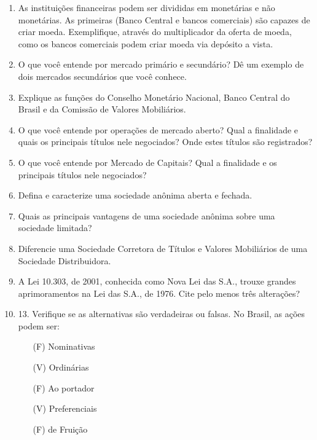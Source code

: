 \documentclass{article}
\begin{document}
\begin{enumerate}
    \item As instituições financeiras podem ser divididas em monetárias e não
        monetárias. As primeiras (Banco Central e bancos comerciais) são
        capazes de criar moeda. Exemplifique, através do multiplicador da
        oferta de moeda, como os bancos comerciais podem criar moeda via
        depósito a vista.

    \item O que você entende por mercado primário e secundário? Dê um exemplo
        de dois mercados secundários que você conhece.

    \item Explique as funções do Conselho Monetário Nacional, Banco Central do
        Brasil e da Comissão de Valores Mobiliários.

    \item O que você entende por operações de mercado aberto? Qual a finalidade
        e quais os principais títulos nele negociados? Onde estes títulos são
        registrados?

    \item O que você entende por Mercado de Capitais? Qual a finalidade e os
        principais títulos nele negociados?

    \item Defina e caracterize uma sociedade anônima aberta e fechada.

    \item Quais as principais vantagens de uma sociedade anônima sobre uma
        sociedade limitada?

    \item Diferencie uma Sociedade Corretora de Títulos e Valores Mobiliários
        de uma Sociedade Distribuidora.

    \item A Lei 10.303, de 2001, conhecida como Nova Lei das S.A., trouxe
        grandes aprimoramentos na Lei das S.A., de 1976. Cite pelo menos três
        alterações?

    \item 13. Verifique se as alternativas são verdadeiras ou falsas.
        No Brasil, as ações podem ser:

        \begin{itemize}
            \item[(F)] Nominativas
            \item[(V)] Ordinárias
            \item[(F)] Ao portador
            \item[(V)] Preferenciais
            \item[(F)] de Fruição
        \end{itemize}
\end{enumerate}
\end{document}
